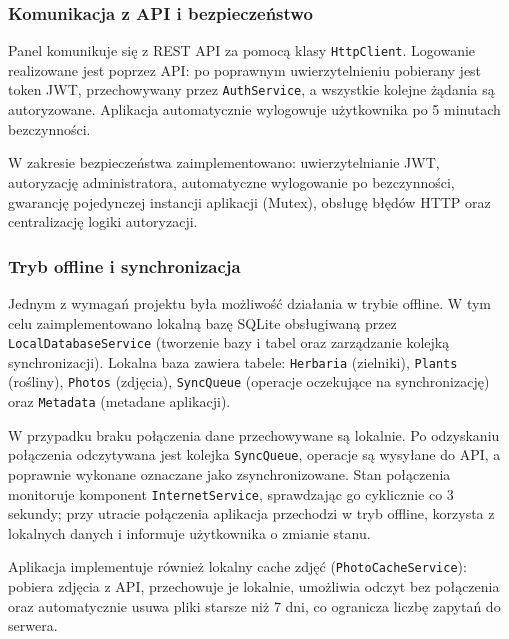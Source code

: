 \documentclass[12pt,a4paper]{article}
\begin{document}
\subsubsection{Komunikacja z API i bezpiecze\'nstwo}

Panel komunikuje si\k{e} z REST API za pomoc\k{a} klasy \texttt{HttpClient}. Logowanie realizowane jest poprzez API: po poprawnym uwierzytelnieniu pobierany jest token JWT, przechowywany przez \texttt{AuthService}, a wszystkie kolejne \.z\k{a}dania s\k{a} autoryzowane. Aplikacja automatycznie wylogowuje u\.zytkownika po 5 minutach bezczynno\'sci.

W zakresie bezpiecze\'nstwa zaimplementowano: uwierzytelnianie JWT, autoryzacj\k{e} administratora, automatyczne wylogowanie po bezczynno\'sci, gwarancj\k{e} pojedynczej instancji aplikacji (Mutex), obs\l{}ug\k{e} b\l{}\k{e}d\'ow HTTP oraz centralizacj\k{e} logiki autoryzacji.

\subsubsection{Tryb offline i synchronizacja}

Jednym z wymaga\'n projektu by\l{}a mo\.zliwo\'s\'c dzia\l{}ania w trybie offline. W tym celu zaimplementowano lokaln\k{a} baz\k{e} SQLite obs\l{}ugiwan\k{a} przez \texttt{LocalDatabaseService} (tworzenie bazy i tabel oraz zarz\k{a}dzanie kolejk\k{a} synchronizacji). Lokalna baza zawiera tabele: \texttt{Herbaria} (zielniki), \texttt{Plants} (ro\'sliny), \texttt{Photos} (zdj\k{e}cia), \texttt{SyncQueue} (operacje oczekuj\k{a}ce na synchronizacj\k{e}) oraz \texttt{Metadata} (metadane aplikacji).

W przypadku braku po\l{}\k{a}czenia dane przechowywane s\k{a} lokalnie. Po odzyskaniu po\l{}\k{a}czenia odczytywana jest kolejka \texttt{SyncQueue}, operacje s\k{a} wysy\l{}ane do API, a poprawnie wykonane oznaczane jako zsynchronizowane. Stan po\l{}\k{a}czenia monitoruje komponent \texttt{InternetService}, sprawdzaj\k{a}c go cyklicznie co 3 sekundy; przy utracie po\l{}\k{a}czenia aplikacja przechodzi w tryb offline, korzysta z lokalnych danych i informuje u\.zytkownika o zmianie stanu.

Aplikacja implementuje r\'ownie\.z lokalny cache zdj\k{e}\'c (\texttt{PhotoCacheService}): pobiera zdj\k{e}cia z API, przechowuje je lokalnie, umo\.zliwia odczyt bez po\l{}\k{a}czenia oraz automatycznie usuwa pliki starsze ni\.z 7 dni, co ogranicza liczb\k{e} zapyta\'n do serwera.
\end{document}
